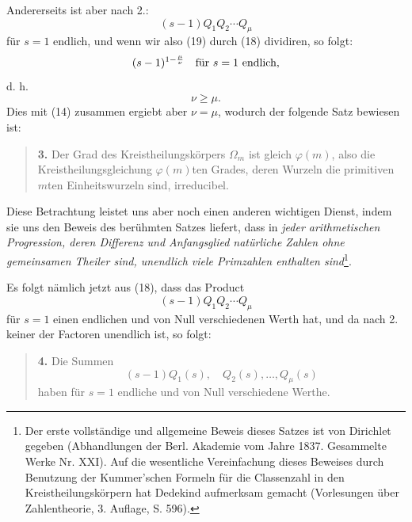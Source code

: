 \documentclass[11pt]{article}
\begin{document}
Andererseits ist aber nach 2.:
\begin{equation}\tag{19}
(s-1)Q_1Q_2\cdots Q_\mu
\end{equation}
für $s=1$ endlich, und wenn wir also (19) durch (18) dividiren, so folgt:
\[
(s-1)^{1-\frac{\mu}{\nu}}\quad\hbox{für }s=1\hbox{ endlich,}
\]
d. h.
\begin{equation}\tag{20}
\nu\geq\mu.
\end{equation}
Dies mit (14) zusammen ergiebt aber $\nu=\mu$, wodurch der folgende Satz bewiesen ist:

\begin{quote}
\textbf{3.} Der Grad des Kreistheilungskörpers $\Omega_m$ ist gleich $\varphi(m)$, also die Kreistheilungsgleichung $\varphi(m)$ten Grades, deren Wurzeln die primitiven $m$ten Einheitswurzeln sind, irreducibel.
\end{quote}

Diese Betrachtung leistet uns aber noch einen anderen wichtigen Dienst, indem sie uns den Beweis des berühmten Satzes liefert, dass in \emph{jeder arithmetischen Progression, deren Differenz und Anfangsglied natürliche Zahlen ohne gemeinsamen Theiler sind, unendlich viele Primzahlen enthalten sind}\footnote{Der erste vollständige und allgemeine Beweis dieses Satzes ist von Dirichlet gegeben (Abhandlungen der Berl. Akademie vom Jahre 1837. Gesammelte Werke Nr. XXI). Auf die wesentliche Vereinfachung dieses Beweises durch Benutzung der Kummer'schen Formeln für die Classenzahl in den Kreistheilungskörpern hat Dedekind aufmerksam gemacht (Vorlesungen über Zahlentheorie, 3. Auflage, S. 596).}.

Es folgt nämlich jetzt aus (18), dass das Product
\[
(s-1)Q_1Q_2\cdots Q_\mu
\]
für $s=1$ einen endlichen und von Null verschiedenen Werth hat, und da nach 2. keiner der Factoren unendlich ist, so folgt:

\begin{quote}
\textbf{4.} Die Summen
\[
(s-1)Q_1(s),\quad Q_2(s),\ldots,Q_\mu(s)
\]
haben für $s=1$ endliche und von Null verschiedene Werthe.
\end{quote}
\end{document}
